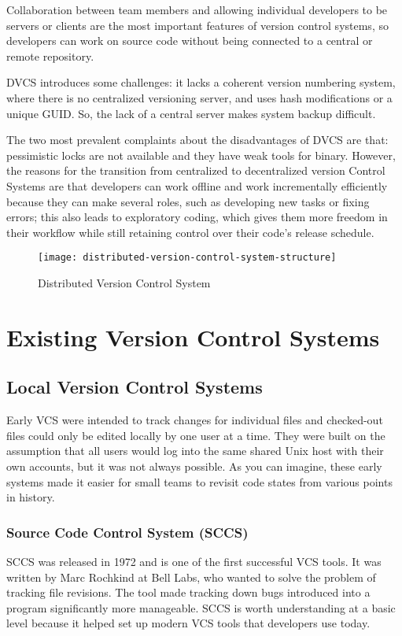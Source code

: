 Collaboration between team members and allowing individual developers to be servers or clients are the most important features of version control systems, so developers can work on source code without being connected to a central or remote repository.

DVCS introduces some challenges: it lacks a coherent version numbering system, where there is no centralized versioning server, and uses hash modifications or a unique GUID. So, the lack of a central server makes system backup difficult.

The two most prevalent complaints about the disadvantages of DVCS are that: pessimistic locks are not available and they have weak tools for binary. However, the reasons for the transition from centralized to decentralized version Control Systems are that developers can work offline and work incrementally efficiently because they can make several roles, such as developing new tasks or fixing errors; this also leads to exploratory coding, which gives them more freedom in their workflow while still retaining control over their code's release schedule.

\begin{figure}[h]
    \centering
    \texttt{[image: distributed-version-control-system-structure]}
    \caption{Distributed Version Control System}
    \label{fig:dvcs-structure}
\end{figure}
\section{Existing Version Control Systems}
\subsection{Local Version Control Systems}
Early VCS were intended to track changes for individual files and checked-out files could only be edited locally by one user at a time. They were built on the assumption that all users would log into the same shared Unix host with their own accounts, but it was not always possible. As you can imagine, these early systems made it easier for small teams to revisit code states from various points in history.
\subsubsection{Source Code Control System (SCCS)}
SCCS was released in 1972 and is one of the first successful VCS tools. It was written by Marc Rochkind at Bell Labs, who wanted to solve the problem of tracking file revisions. The tool made tracking down bugs introduced into a program significantly more manageable. SCCS is worth understanding at a basic level because it helped set up modern VCS tools that developers use today.
